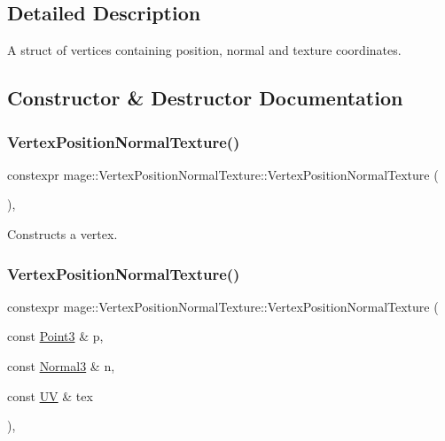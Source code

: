 \subsection{Detailed Description}
A struct of vertices containing position, normal and texture coordinates. 

\subsection{Constructor \& Destructor Documentation}
\hypertarget{structmage_1_1_vertex_position_normal_texture_a68130a9df83c3663c02d12ac96487d55}{}\label{structmage_1_1_vertex_position_normal_texture_a68130a9df83c3663c02d12ac96487d55} 
\subsubsection{\texorpdfstring{Vertex\+Position\+Normal\+Texture()}{VertexPositionNormalTexture()}\hspace{0.1cm}{\footnotesize\ttfamily [1/4]}}
{\footnotesize\ttfamily constexpr mage\+::\+Vertex\+Position\+Normal\+Texture\+::\+Vertex\+Position\+Normal\+Texture (\begin{DoxyParamCaption}{ }\end{DoxyParamCaption})\hspace{0.3cm}{\ttfamily [default]}, {\ttfamily [noexcept]}}

Constructs a vertex. \hypertarget{structmage_1_1_vertex_position_normal_texture_a40cc5e13738419d90063ef04646dc872}{}\label{structmage_1_1_vertex_position_normal_texture_a40cc5e13738419d90063ef04646dc872} 
\subsubsection{\texorpdfstring{Vertex\+Position\+Normal\+Texture()}{VertexPositionNormalTexture()}\hspace{0.1cm}{\footnotesize\ttfamily [2/4]}}
{\footnotesize\ttfamily constexpr mage\+::\+Vertex\+Position\+Normal\+Texture\+::\+Vertex\+Position\+Normal\+Texture (\begin{DoxyParamCaption}\item[{const \hyperlink{structmage_1_1_point3}{Point3} \&}]{p,  }\item[{const \hyperlink{structmage_1_1_normal3}{Normal3} \&}]{n,  }\item[{const \hyperlink{structmage_1_1_u_v}{UV} \&}]{tex }\end{DoxyParamCaption})\hspace{0.3cm}{\ttfamily [explicit]}, {\ttfamily [noexcept]}}

